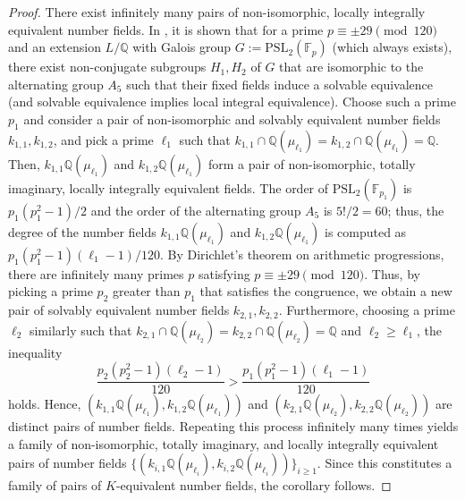 \documentclass{article}
\numberwithin{equation}{section} %
\begin{document}
\begin{proof}
  There exist infinitely many pairs of non-isomorphic, locally integrally equivalent number fields. In \cite[Theorem 3.9, Remark 3.11]{Sutherland}, it is shown that for a prime $p \equiv \pm 29 \pmod{120}$ and an extension $L/\mathbb{Q}$ with Galois group $G := \mathrm{PSL}_2(\mathbb{F}_p)$ (which always exists), there exist non-conjugate subgroups $H_1, H_2$ of $G$ that are isomorphic to the alternating group $A_5$ such that their fixed fields induce a solvable equivalence (and solvable equivalence implies local integral equivalence). Choose such a prime $p_1$ and consider a pair of non-isomorphic and solvably equivalent number fields $k_{1,1}, k_{1,2}$, and pick a prime $\ell_1$ such that $k_{1,1}\cap \mathbb{Q}(\mu_{\ell_1}) = k_{1,2} \cap \mathbb{Q}(\mu_{\ell_1}) = \mathbb{Q}$. Then, $k_{1,1}\mathbb{Q}(\mu_{\ell_1})$ and $k_{1,2}\mathbb{Q}(\mu_{\ell_1})$ form a pair of non-isomorphic, totally imaginary, locally integrally equivalent fields. The order of $\mathrm{PSL}_2(\mathbb{F}_{p_1})$ is $p_1(p_1^2 - 1)/2$ and the order of the alternating group $A_5$ is $5!/2 = 60$; thus, the degree of the number fields $k_{1,1}\mathbb{Q}(\mu_{\ell_1})$ and $k_{1,2}\mathbb{Q}(\mu_{\ell_1})$ is computed as $p_1(p_1^2-1)(\ell_1 - 1)/120$. By Dirichlet's theorem on arithmetic progressions, there are infinitely many primes $p$ satisfying $p \equiv \pm 29 \pmod{120}$. Thus, by picking a prime $p_2$ greater than $p_1$ that satisfies the congruence, we obtain a new pair of solvably equivalent number fields $k_{2,1}, k_{2,2}$. Furthermore, choosing a prime $\ell_2$ similarly such that $k_{2,1}\cap \mathbb{Q}(\mu_{\ell_2}) = k_{2,2}\cap \mathbb{Q}(\mu_{\ell_2}) = \mathbb{Q}$ and $\ell_2 \geq \ell_1$, the inequality
  \[
    \frac{p_2(p_2^2 - 1)(\ell_2 - 1)}{120} > \frac{p_1(p_1^2 - 1)(\ell_1 - 1)}{120}
  \]
  holds. Hence, $(k_{1,1}\mathbb{Q}(\mu_{\ell_1}), k_{1,2}\mathbb{Q}(\mu_{\ell_1}))$ and $(k_{2,1}\mathbb{Q}(\mu_{\ell_2}), k_{2,2}\mathbb{Q}(\mu_{\ell_2}))$ are distinct pairs of number fields. Repeating this process infinitely many times yields a family of non-isomorphic, totally imaginary, and locally integrally equivalent pairs of number fields $\{(k_{i,1}\mathbb{Q}(\mu_{\ell_i}), k_{i,2}\mathbb{Q}(\mu_{\ell_i}))\}_{i\geq 1}$. Since this constitutes a family of pairs of $K$-equivalent number fields, the corollary follows.
\end{proof}
        
\end{document}
